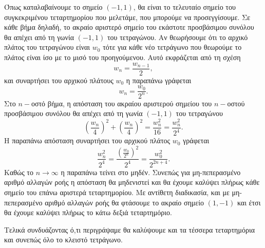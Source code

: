 \begin{solution}
    Όπως καταλαβαίνουμε το σημείο \( (-1, 1) \), θα είναι το τελευταίο σημείο του
    συγκεκριμένου τεταρτημορίου που μελετάμε, που μπορούμε να προσεγγίσουμε.
    Σε κάθε βήμα δηλαδή, το ακραίο αριστερό σημείο του εκάστοτε προσβάσιμου συνόλου
    θα απέχει από τη γωνία \( (-1, 1) \) του τετραγώνου. Αν θεωρήσουμε ότι το αρχικό πλάτος
    του τετραγώνου είναι \( w_0 \) τότε για κάθε νέο τετράγωνο που θεωρούμε το πλάτος
    είναι ίσο με το μισό του προηγούμενου. Αυτό εκφράζεται από τη σχέση
    \[
        w_{n} = \frac{w_{n - 1}}{2},
    \]
    και συναρτήσει του αρχικού πλάτους \( w_0 \) η παραπάνω γράφεται
    \[
        w_n = \frac{w_0}{2^n}.
    \]
    Στο \(n-\)οστό βήμα, η απόσταση του ακραίου αριστερού σημείου του
    \(n-\)οστού προσβάσιμου συνόλου θα απέχει από τη γωνία \( (-1, 1) \) του
    τετραγώνου
    \[
        \left(\frac{w_n}{4}\right)^2 + \left(\frac{w_n}{4}\right)^2
        = \frac{w_n^2}{16} = \frac{w_n^2}{2^4}.
    \]
    Η παραπάνω απόσταση συναρτήσει του αρχικού πλάτος \( w_0 \) γράφεται
    \[
        \frac{w_n^2}{2^4} = \frac{\left(\frac{w_0}{2^n}\right)^2}{2^4}
        = \frac{w_0^2}{2^{2n + 4}}.
    \]
    Καθώς το \( n \to \infty \) η παραπάνω τείνει στο μηδέν. Συνεπώς για
    μη-πεπερασμένο αριθμό αλλαγών ροής η απόσταση θα μηδενιστεί και θα έχουμε
    καλύψει πλήρως κάθε σημείο του επάνω αριστερά τεταρτημορίου. Με αντίθετη διαδικασία,
    και με μη-πεπερασμένο αριθμό αλλαγών ροής θα φτάσουμε το ακραίο σημείο
    \( (1, -1) \) και έτσι θα έχουμε καλύψει πλήρως το κάτω δεξιά τεταρτημόριο.

    Τελικά συνδυάζοντας ό,τι περιγράψαμε θα καλύψουμε και τα τέσσερα
    τεταρτημόρια και συνεπώς όλο το κλειστό τετράγωνο.
\end{solution}
